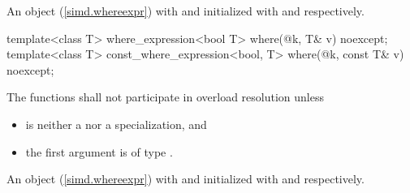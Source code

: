 \begin{itemdescr}
  \pnum\returns
  An object (\ref{simd.whereexpr}) with  and  initialized with  and  respectively.
\end{itemdescr}

\begin{itemdecl}
template<class T>
  where_expression<bool T>
    where(@\seebelow@ k, T& v) noexcept;
template<class T>
  const_where_expression<bool, T>
    where(@\seebelow@ k, const T& v) noexcept;
\end{itemdecl}

\begin{itemdescr}
  \pnum\remarks
  The functions shall not participate in overload resolution unless

  \begin{itemize}
    \item {} is neither a  nor a  specialization, and
    \item the first argument is of type .
  \end{itemize}

  \pnum\returns
  An object (\ref{simd.whereexpr}) with  and  initialized with  and  respectively.
\end{itemdescr}

